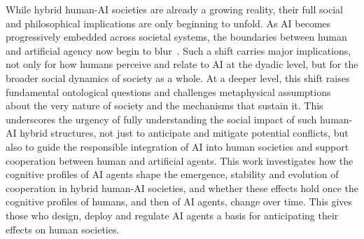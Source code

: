While hybrid human-AI societies are already a growing reality, their full social and philosophical implications are only beginning to unfold. As AI becomes progressively embedded across societal systems, the boundaries between human and artificial agency now begin to blur~\cite{guzmanOntologicalBoundariesHumans2020}. Such a shift carries major implications, not only for how humans perceive and relate to AI at the dyadic level, but for the broader social dynamics of society as a whole. At a deeper level, this shift raises fundamental ontological questions and challenges metaphysical assumptions about the very nature of society and the mechanisms that sustain it. This underscores the urgency of fully understanding the social impact of such human-AI hybrid structures, not just to anticipate and mitigate potential conflicts, but also to guide the responsible integration of AI into human societies and support cooperation between human and artificial agents. This work investigates how the cognitive profiles of AI agents shape the emergence, stability and evolution of cooperation in hybrid human-AI societies, and whether these effects hold once the cognitive profiles of humans, and then of AI agents, change over time. This gives those who design, deploy and regulate AI agents a basis for anticipating their effects on human societies.
